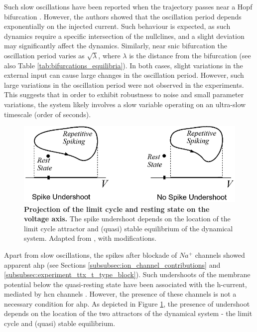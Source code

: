 \documentclass[../main.tex]{subfiles}
\begin{document}
Such slow oscillations have been reported when the trajectory passes near a Hopf bifurcation \parencite{doiGenerationVerySlow2005}. However, the authors showed that the oscillation period depends exponentially on the injected current. Such behaviour is expected, as such dynamics require a specific intersection of the nullclines, and a slight deviation may significantly affect the dynamics. Similarly, near \gls{snic} bifurcation the oscillation period varies as $\sqrt{\lambda}$, where $\lambda$ is the distance from the bifurcation \parencite{strogatzNonlinearDynamicsChaos2018,izhikevichNEURALEXCITABILITYSPIKING2000} (see also Table \ref{tab:bifurcations_equilibria}). In both cases, slight variations in the external input can cause large changes in the oscillation period. However, such large variations in the oscillation period were not observed in the experiments. This suggests that in order to exhibit robustness to noise and small parameter variations, the system likely involves a slow variable operating on an ultra-slow timescale (order of seconds).

\begin{figure}[!b]
    \centering
    \includegraphics[width=0.85\linewidth]{../img/2_mathematical_overview/spike_undershoot_bw.png}
    \caption[Projection of the limit cycle and resting state on the voltage axis.]{
        \textbf{Projection of the limit cycle and resting state on the voltage axis.} 
        The spike undershoot depends on the location of the limit cycle attractor and (quasi) stable equilibrium of the dynamical system.
        Adapted from \parencite{izhikevichNEURALEXCITABILITYSPIKING2000}, with modifications.
    }
    \label{fig:potential_undershoot_izhikevich}
\end{figure}

Apart from slow oscillations, the spikes after blockade of $Na^+$ channels showed apparent \gls{ahp} (see Sections \ref{subsubsec:ion_channel_contributions} and \ref{subsubsec:experiment_ttx_t_type_block}). Such undershoots of the membrane potential below the quasi-resting state have been associated with the h-current, mediated by \gls{hcn} channels \parencite{oswaldIHCurrentGenerates2009,boninHyperpolarizationActivatedCurrentIh2013}. However, the presence of these channels is not a necessary condition for \gls{ahp}. As depicted in Figure \ref{fig:potential_undershoot_izhikevich}, the presence of undershoot depends on the location of the two attractors of the dynamical system - the limit cycle and (quasi) stable equilibrium.
\end{document}
